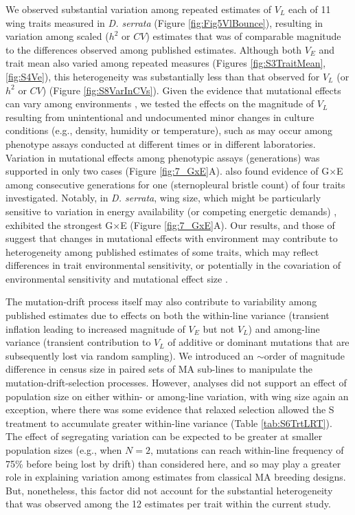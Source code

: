 We observed substantial variation among repeated estimates of $V_L$ each of 11 wing traits measured in \textit{D. serrata} (Figure \ref{fig:Fig5VlBounce}), resulting in variation among scaled ($h^2$ or $CV$) estimates that was of comparable magnitude to the differences observed among published estimates. Although both $V_E$ and trait mean also varied among repeated measures (Figures \ref{fig:S3TraitMean}, \ref{fig:S4Ve}), this heterogeneity was substantially less than that observed for $V_L$ (or $h^2$ or $CV$) (Figure \ref{fig:S8VarInCVs}). Given the evidence that mutational effects can vary among environments \citep{Kond94,Mart06}, we tested the effects on the magnitude of $V_L$ resulting from unintentional and undocumented minor changes in culture conditions (e.g., density, humidity or temperature), such as may occur among phenotype assays conducted at different times or in different laboratories. Variation in mutational effects among phenotypic assays (generations) was supported in only two cases (Figure \ref{fig:7_GxE}A). \citet{Garc00} also found evidence of G$\times$E among consecutive generations for one (sternopleural bristle count) of four traits investigated. Notably, in \textit{D. serrata}, wing size, which might be particularly sensitive to variation in energy availability (or competing energetic demands) \citep{Cavi85, Bitn99}, exhibited the strongest G$\times$E (Figure \ref{fig:7_GxE}A). Our results, and those of \citet{Garc00} suggest that changes in mutational effects with environment may contribute to heterogeneity among published estimates of some traits, which may reflect differences in trait environmental sensitivity, or potentially in the covariation of environmental sensitivity and mutational effect size \citep{Lync99,Garc00}. \par

The mutation-drift process itself may also contribute to variability among published estimates due to effects on both the within-line variance (transient inflation leading to increased magnitude of $V_E$ but not $V_L$) and among-line variance (transient contribution to $V_L$ of additive or dominant mutations that are subsequently lost via random sampling). We introduced an $\sim$order of magnitude difference in census size in paired sets of MA sub-lines to manipulate the mutation-drift-selection processes. However, analyses did not support an effect of population size on either within- or among-line variation, with wing size again an exception, where there was some evidence that relaxed selection allowed the S treatment to accumulate greater within-line variance (Table \ref{tab:S6TrtLRT}). The effect of segregating variation can be expected to be greater at smaller population sizes (e.g., when $N = 2$, mutations can reach within-line frequency of 75\% before being lost by drift) than considered here, and so may play a greater role in explaining variation among estimates from classical MA breeding designs. But, nonetheless, this factor did not account for the substantial heterogeneity that was observed among the 12 estimates per trait within the current study. \par

